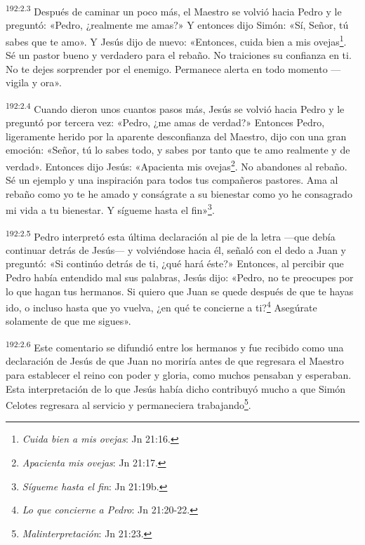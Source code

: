\par 
\textsuperscript{192:2.3} Después de caminar un poco más, el Maestro se volvió hacia Pedro y le preguntó: «Pedro, ¿realmente me amas?» Y entonces dijo Simón: «Sí, Señor, tú sabes que te amo». Y Jesús dijo de nuevo: «Entonces, cuida bien a mis ovejas\footnote{\textit{Cuida bien a mis ovejas}: Jn 21:16.}. Sé un pastor bueno y verdadero para el rebaño. No traiciones su confianza en ti. No te dejes sorprender por el enemigo. Permanece alerta en todo momento ---vigila y ora».

\par 
\textsuperscript{192:2.4} Cuando dieron unos cuantos pasos más, Jesús se volvió hacia Pedro y le preguntó por tercera vez: «Pedro, ¿me amas de verdad?» Entonces Pedro, ligeramente herido por la aparente desconfianza del Maestro, dijo con una gran emoción: «Señor, tú lo sabes todo, y sabes por tanto que te amo realmente y de verdad». Entonces dijo Jesús: «Apacienta mis ovejas\footnote{\textit{Apacienta mis ovejas}: Jn 21:17.}. No abandones al rebaño. Sé un ejemplo y una inspiración para todos tus compañeros pastores. Ama al rebaño como yo te he amado y conságrate a su bienestar como yo he consagrado mi vida a tu bienestar. Y sígueme hasta el fin»\footnote{\textit{Sígueme hasta el fin}: Jn 21:19b.}.

\par 
\textsuperscript{192:2.5} Pedro interpretó esta última declaración al pie de la letra ---que debía continuar detrás de Jesús--- y volviéndose hacia él, señaló con el dedo a Juan y preguntó: «Si continúo detrás de ti, ¿qué hará éste?» Entonces, al percibir que Pedro había entendido mal sus palabras, Jesús dijo: «Pedro, no te preocupes por lo que hagan tus hermanos. Si quiero que Juan se quede después de que te hayas ido, o incluso hasta que yo vuelva, ¿en qué te concierne a ti?\footnote{\textit{Lo que concierne a Pedro}: Jn 21:20-22.} Asegúrate solamente de que me sigues».

\par 
\textsuperscript{192:2.6} Este comentario se difundió entre los hermanos y fue recibido como una declaración de Jesús de que Juan no moriría antes de que regresara el Maestro para establecer el reino con poder y gloria, como muchos pensaban y esperaban. Esta interpretación de lo que Jesús había dicho contribuyó mucho a que Simón Celotes regresara al servicio y permaneciera trabajando\footnote{\textit{Malinterpretación}: Jn 21:23.}.

